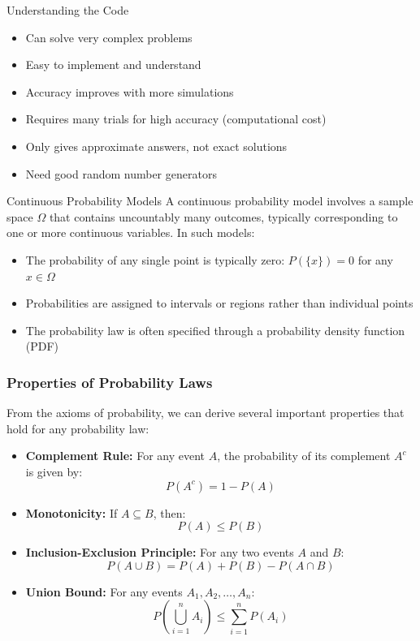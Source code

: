 \begin{itemize}
\begin{keyconceptboxbreak}{Understanding the Code}
\begin{itemize}
    \item[$+$] Can solve very complex problems
    \item[$+$] Easy to implement and understand
    \item[$+$] Accuracy improves with more simulations
    \item[$-$] Requires many trials for high accuracy (computational cost)
    \item[$-$] Only gives approximate answers, not exact solutions
    \item[$-$] Need good random number generators
\end{itemize}

\end{keyconceptboxbreak}

\begin{definitionboxbreak}{Continuous Probability Models}
A continuous probability model involves a sample space $\Omega$ that contains uncountably many outcomes, typically corresponding to one or more continuous variables. In such models:
\begin{itemize}
    \item The probability of any single point is typically zero: $P(\{x\}) = 0$ for any $x \in \Omega$
    \item Probabilities are assigned to intervals or regions rather than individual points
    \item The probability law is often specified through a probability density function (PDF)
\end{itemize}
\end{definitionboxbreak}

\subsubsection{Properties of Probability Laws}

From the axioms of probability, we can derive several important properties that hold for any probability law:
\begin{itemize}
    \item \textbf{Complement Rule:} For any event \(A\), the probability of its complement \(A^c\) is given by:
    \[ P(A^c) = 1 - P(A) \]
    \item \textbf{Monotonicity:} If \(A \subseteq B\), then:
    \[ P(A) \leq P(B) \]
    \item \textbf{Inclusion-Exclusion Principle:} For any two events \(A\) and \(B\):
    \[ P(A \cup B) = P(A) + P(B) - P(A \cap B) \]
    \item \textbf{Union Bound:} For any events \(A_1, A_2, \ldots, A_n\):
    \[ P\left(\bigcup_{i=1}^{n} A_i\right) \leq \sum_{i=1}^{n} P(A_i) \]
\end{itemize}


\end{itemize}
